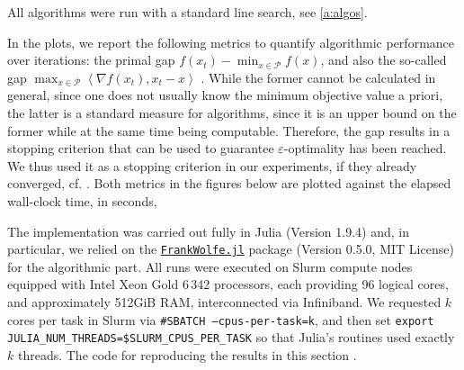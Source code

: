 \documentclass[twoside]{article}
\newcommand{\mP}{\mathcal{P}}
\newcommand{\innp}[1]{\left\langle #1 \right\rangle}
\let\epsilon\varepsilon
\begin{document}
All algorithms were run with a standard line search, see \cref{a:algos}.

In the plots, we report the following metrics to quantify algorithmic performance over iterations: the primal gap $f(x_t)-\min_{x\in\mP}f(x)$, and also the so-called \FW{} gap $\max_{x \in \mathcal{P}} \innp{\nabla f(x_t), x_t - x}$ \citep{BCC+23}. 
While the former cannot be calculated in general, since one does not usually know the minimum objective value a priori, the latter is a standard measure for \FW{} algorithms, since it is an upper bound on the former while at the same time being computable.
Therefore, the \FW{} gap results in a stopping criterion that can be used to guarantee $\epsilon$-optimality has been reached.
We thus used it as a stopping criterion in our experiments, if they already converged, cf. \citep{Jag13}.
Both metrics in the figures below are plotted against
the elapsed wall-clock time, in seconds, 


The implementation was carried out fully in Julia (Version 1.9.4) and, in particular, we relied on the \href{https://github.com/ZIB-IOL/FrankWolfe.jl}{\texttt{FrankWolfe.jl}} package (Version 0.5.0, MIT License) for the algorithmic part.
All runs were executed on Slurm compute nodes equipped with Intel Xeon Gold 6\,342 processors, each providing 96 logical cores, and approximately 512GiB RAM, interconnected via Infiniband.
We requested $k$ cores per task in Slurm via \texttt{\#SBATCH\ --cpus-per-task=k}, and then set \texttt{export JULIA\_NUM\_THREADS=\$SLURM\_CPUS\_PER\_TASK} so that Julia's \FW{} routines used exactly $k$ threads.
The code for reproducing the results in this section .%
\end{document}
